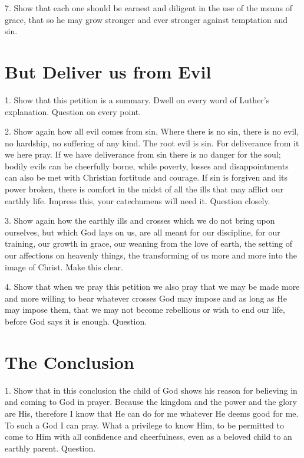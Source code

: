 7. Show that each one should be earnest and diligent in the use of the means of grace, that so he
may grow stronger and ever stronger against temptation and sin.

\section{But Deliver us from Evil}

1. Show that this petition is a summary. Dwell on every word of Luther’s explanation. Question on every point.

2. Show again how all evil comes from sin. Where there is no sin, there is no evil, no hardship, no suffering of any kind. The root evil is sin. For deliverance from it we here pray. If we have deliverance from sin there is no danger for the soul; bodily evils can be cheerfully borne, while poverty, losses and disappointments can also be met with Christian fortitude and courage. If sin is forgiven and its power broken, there is comfort in the midst of all the ills that may afflict our earthly life. Impress this, your catechumens will need it. Question closely. 

3. Show again how the earthly ills and crosses which we do not bring upon ourselves, but which God lays on us, are all meant for our discipline, for our training, our growth in grace, our weaning from the love of earth, the setting of our affections on heavenly things, the transforming of us more and more into the image of Christ. Make this clear. 

4. Show that when we pray this petition we also
pray that we may be made more and more willing to bear whatever crosses God may impose and as long as He may impose them, that we may not become rebellious or wish to end our life, before God says it is enough. Question.

\section{The Conclusion}

1. Show that in this conclusion the child of God shows his reason for believing in and coming to God in prayer. Because the kingdom and the power and the glory are His, therefore I know that He can do for me whatever He deems good for me. To such a God I can pray. What a privilege to know Him, to be permitted to come to Him with all confidence and cheerfulness, even as a beloved child to an earthly parent. Question. 

